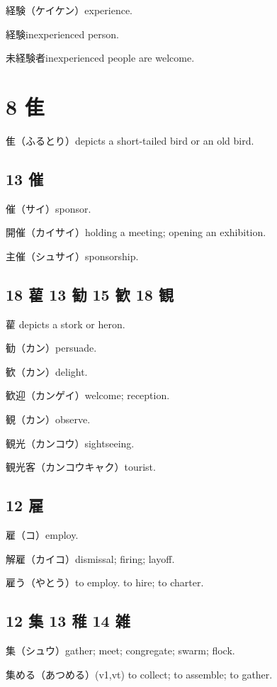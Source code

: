 経験（ケイケン）experience.

経験inexperienced person.

未経験者inexperienced people are welcome.

\section{8 隹}

隹（ふるとり）depicts a short-tailed bird or an old bird.

\subsection{13 催}

催（サイ）sponsor.

開催（カイサイ）holding a meeting; opening an exhibition.

主催（シュサイ）sponsorship.

\subsection{18 雚 13 勧 15 歓 18 観}

雚 depicts a stork or heron.

勧（カン）persuade.

歓（カン）delight.

歓迎（カンゲイ）welcome; reception.

観（カン）observe.

観光（カンコウ）sightseeing.

観光客（カンコウキャク）tourist.

\subsection{12 雇}

雇（コ）employ.

解雇（カイコ）dismissal; firing; layoff.

雇う（やとう）to employ. to hire; to charter.

\subsection{12 集 13 稚 14 雑}

集（シュウ）gather; meet; congregate; swarm; flock.

集める（あつめる）(v1,vt) to collect; to assemble; to gather.


